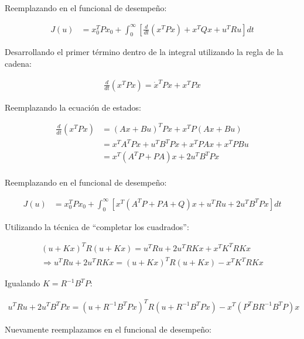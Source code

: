 Reemplazando en el funcional de desempeño:

\begin{align}
    J(u) &= x_0^T P x_0 + \int_{0}^{\infty} \left[\frac{d}{dt}\left( x^T P x\right) + x ^T Q x+u^T R u \right] dt
\end{align}

Desarrollando el primer término dentro de la integral utilizando la regla de la cadena:

\begin{align}
    \frac{d}{dt}\left( x^T P x\right) = \dot{x}^T P x + x^T P \dot{x}
\end{align}

Reemplazando la ecuación de estados:

\begin{align}
    \frac{d}{dt}\left( x^T P x\right) &= \left(A x + B u\right)^T P x + x^T P \left(A x + B u\right)\\
    &= x^T A^T P x + u^T B^T P x + x^T P A x + x^T P B u \\
    &= x^T \left( A^T P + PA\right) x + 2 u^T B^T P x \\
\end{align}

Reemplazando en el funcional de desempeño:

\begin{align}
    J(u) &= x_0^T P x_0 + \int_{0}^{\infty} \left[ x^T \left( A^T P + PA + Q\right) x + u^T R u  + 2 u^T B^T P x \right] dt
\end{align}

Utilizando la técnica de ``completar los cuadrados'':

\begin{subequations}
\begin{align}
    \left( u + K x\right)^T R \left( u + K x\right) = u^T R u + 2 u^T R K x + x^T K^T R K x \\
    \Rightarrow  u^T R u + 2 u^T R K x =  \left( u + K x\right)^T R \left( u + K x\right) - x^T K^T R K x
\end{align}   
\end{subequations}

Igualando $K = R^{-1} B^T P$:

\begin{align}
    u^T R u + 2 u^T B^T P x =  \left( u + R^{-1} B^T P x\right)^T R \left( u + R^{-1} B^T P x\right) - x^T \left(P^T B R^{-1} B^T P \right) x
\end{align}

Nuevamente reemplazamos en el funcional de desempeño:


